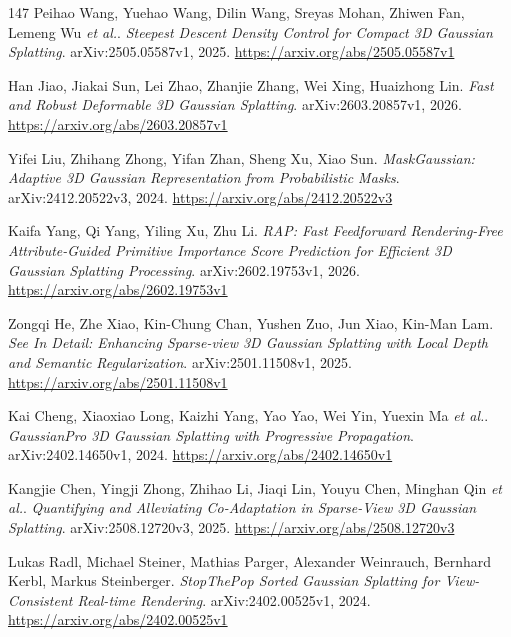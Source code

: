\documentclass[11pt,a4paper]{article}
\begin{document}
\begin{thebibliography}{147}
Peihao Wang, Yuehao Wang, Dilin Wang, Sreyas Mohan, Zhiwen Fan, Lemeng Wu \emph{et al.}.
\newblock \emph{Steepest Descent Density Control for Compact 3D Gaussian Splatting}.
\newblock arXiv:2505.05587v1, 2025.
\newblock \url{https://arxiv.org/abs/2505.05587v1}

Han Jiao, Jiakai Sun, Lei Zhao, Zhanjie Zhang, Wei Xing, Huaizhong Lin.
\newblock \emph{Fast and Robust Deformable 3D Gaussian Splatting}.
\newblock arXiv:2603.20857v1, 2026.
\newblock \url{https://arxiv.org/abs/2603.20857v1}

Yifei Liu, Zhihang Zhong, Yifan Zhan, Sheng Xu, Xiao Sun.
\newblock \emph{MaskGaussian: Adaptive 3D Gaussian Representation from Probabilistic Masks}.
\newblock arXiv:2412.20522v3, 2024.
\newblock \url{https://arxiv.org/abs/2412.20522v3}

Kaifa Yang, Qi Yang, Yiling Xu, Zhu Li.
\newblock \emph{RAP: Fast Feedforward Rendering-Free Attribute-Guided Primitive Importance Score Prediction for Efficient 3D Gaussian Splatting Processing}.
\newblock arXiv:2602.19753v1, 2026.
\newblock \url{https://arxiv.org/abs/2602.19753v1}

Zongqi He, Zhe Xiao, Kin-Chung Chan, Yushen Zuo, Jun Xiao, Kin-Man Lam.
\newblock \emph{See In Detail: Enhancing Sparse-view 3D Gaussian Splatting with Local Depth and Semantic Regularization}.
\newblock arXiv:2501.11508v1, 2025.
\newblock \url{https://arxiv.org/abs/2501.11508v1}

Kai Cheng, Xiaoxiao Long, Kaizhi Yang, Yao Yao, Wei Yin, Yuexin Ma \emph{et al.}.
\newblock \emph{GaussianPro 3D Gaussian Splatting with Progressive Propagation}.
\newblock arXiv:2402.14650v1, 2024.
\newblock \url{https://arxiv.org/abs/2402.14650v1}

Kangjie Chen, Yingji Zhong, Zhihao Li, Jiaqi Lin, Youyu Chen, Minghan Qin \emph{et al.}.
\newblock \emph{Quantifying and Alleviating Co-Adaptation in Sparse-View 3D Gaussian Splatting}.
\newblock arXiv:2508.12720v3, 2025.
\newblock \url{https://arxiv.org/abs/2508.12720v3}

Lukas Radl, Michael Steiner, Mathias Parger, Alexander Weinrauch, Bernhard Kerbl, Markus Steinberger.
\newblock \emph{StopThePop Sorted Gaussian Splatting for View-Consistent Real-time Rendering}.
\newblock arXiv:2402.00525v1, 2024.
\newblock \url{https://arxiv.org/abs/2402.00525v1}


\end{thebibliography}
\end{document}
